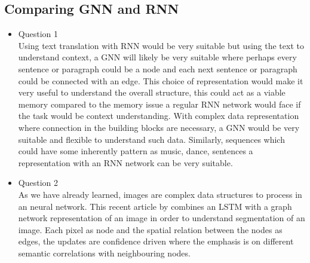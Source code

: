 \documentclass{article}
\begin{document}
\subsection{Comparing GNN and RNN}
\begin{itemize}
  \item Question 1 \\
  Using text translation with RNN would be very suitable but using the text to understand context, a GNN will likely be very suitable where perhaps every sentence or paragraph could be a node and each next sentence or paragraph could be connected with an edge. This choice of representation would make it very useful to understand the overall structure, this could act as a viable memory compared to the memory issue a regular RNN network would face if the task would be context understanding. With complex data representation where connection in the building blocks are necessary, a GNN would be very suitable and flexible to understand such data. Similarly, sequences which could have some inherently pattern as music, dance, sentences a representation with an RNN network can be very suitable.
  \item Question 2 \\
  As we have already learned, images are complex data structures to process in an neural network. This recent article by \cite{liang2016semantic} combines an LSTM with a graph network representation of an image in order to understand segmentation of an image. Each pixel as node and the spatial relation between the nodes as edges, the updates are confidence driven where the emphasis is on different semantic correlations with neighbouring nodes. 
\end{itemize}
 


\end{document}
